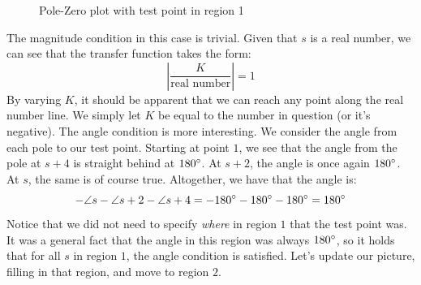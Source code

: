 \begin{figure}[ht]
\begin{tikzpicture}[x=0.75pt,y=0.75pt,yscale=-1,xscale=1]
\end{tikzpicture}


    \caption{Pole-Zero plot with test point in region 1}
    \label{fig:real line test point}
\end{figure}
The magnitude condition in this case is trivial. Given that $s$ is a real number, we can see that the transfer function takes the form:
$$\left|\frac{K}{\text{real number}}\right|=1$$
By varying $K$, it should be apparent that we can reach any point along the real number line. We simply let $K$ be equal to the number in question (or it's negative). The angle condition is more interesting. We consider the angle from each pole to our test point. Starting at point $1$, we see that the angle from the pole at $s+4$ is straight behind at $180\degree$. At $s+2$, the angle is once again $180\degree$.  At $s$, the same is of course true. Altogether, we have that the angle is:
$$-\angle s-\angle s+2 - \angle s+4 =-180\degree-180\degree-180\degree=180\degree$$
Notice that we did not need to specify \textit{where} in region $1$ that the test point was. It was a general fact that the angle in this region was always $180\degree$, so it holds that for all $s$ in region $1$, the angle condition is satisfied. Let's update our picture, filling in that region, and move to region $2$.
